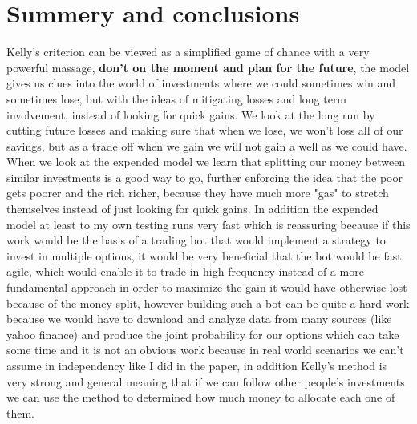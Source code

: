 \documentclass{article}
\begin{document}
	\section{Summery and conclusions}
	Kelly's criterion can be viewed as a simplified game of chance with a very powerful massage, 
	\textbf{don't on the moment and plan for the future}, the model gives us clues into the world of investments where we could sometimes win and sometimes lose, but with the ideas of mitigating losses and long term involvement, instead of looking for quick gains. We look at the long run by cutting future losses and making sure that when we lose, we won't loss all of our savings, but as a trade off when we gain we will not gain a well as we could have.\\
	When we look at the expended model we learn that splitting our money between similar investments is a good way to go, further enforcing the idea that the poor gets poorer and the rich richer, because they have much more "gas" to stretch themselves instead of just looking for quick gains. In addition the expended model at least to my own testing runs very fast which is reassuring because if this work would be the basis of a trading bot that would implement a strategy to invest in multiple options, it would be very beneficial that the bot would be fast agile, which would enable it to trade in high frequency instead of a more fundamental approach in order to maximize the gain it would have otherwise lost because of the money split, however building such a bot can be quite a hard work because we would have to download and analyze  data from many sources (like yahoo finance) and produce the joint probability for our options which can take some time and it is not an obvious work because in real world scenarios we can't assume in independency like I did in the paper, in addition Kelly's method is very strong and general meaning that if we can follow other people's investments we can use the method to determined how much money to allocate each one of them.
	\newpage
	\printbibliography[
	heading=bibintoc,
	title={References}
	]
\end{document}
